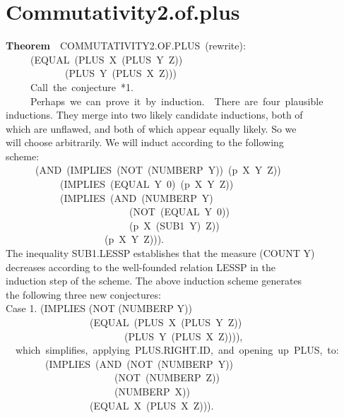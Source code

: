 \documentclass[10pt]{book}
\newenvironment{pubasis}{\begin{flushleft}}{\end{flushleft}}
\newcommand{\axiomordefinition}[1]{\vspace{6pt}\Large\textsf{\textbf{#1}}\normalsize}
\begin{document}
\section{Commutativity2.of.plus}
\begin{pubasis}
\axiomordefinition{Theorem}~~COMMUTATIVITY2.OF.PLUS~(rewrite):\\
~~~~~(EQUAL~(PLUS~X~(PLUS~Y~Z))\\
~~~~~~~~~~~~(PLUS~Y~(PLUS~X~Z)))\\

~~~~~Call~the~conjecture~*1.\\

~~~~~Perhaps~we~can~prove~it~by~induction.~~There~are~four~plausible\\
inductions.  They merge into two likely candidate inductions, both of\\
which are unflawed, and both of which appear equally likely.  So we\\
will choose arbitrarily.  We will induct according to the following\\
scheme:\\
~~~~~~(AND~(IMPLIES~(NOT~(NUMBERP~Y))~(p~X~Y~Z))\\
~~~~~~~~~~~(IMPLIES~(EQUAL~Y~0)~(p~X~Y~Z))\\
~~~~~~~~~~~(IMPLIES~(AND~(NUMBERP~Y)\\
~~~~~~~~~~~~~~~~~~~~~~~~~(NOT~(EQUAL~Y~0))\\
~~~~~~~~~~~~~~~~~~~~~~~~~(p~X~(SUB1~Y)~Z))\\
~~~~~~~~~~~~~~~~~~~~(p~X~Y~Z))).\\
The inequality SUB1.LESSP establishes that the measure (COUNT Y)\\
decreases according to the well-founded relation LESSP in the\\
induction step of the scheme.  The above induction scheme generates\\
the following three new conjectures:\\

Case 1.	(IMPLIES (NOT (NUMBERP Y))\\
~~~~~~~~~~~~~~~~~(EQUAL~(PLUS~X~(PLUS~Y~Z))\\
~~~~~~~~~~~~~~~~~~~~~~~~(PLUS~Y~(PLUS~X~Z)))),\\

~~which~simplifies,~applying~PLUS.RIGHT.ID,~and~opening~up~PLUS,~to:\\

~~~~~~~~(IMPLIES~(AND~(NOT~(NUMBERP~Y))\\
~~~~~~~~~~~~~~~~~~~~~~(NOT~(NUMBERP~Z))\\
~~~~~~~~~~~~~~~~~~~~~~(NUMBERP~X))\\
~~~~~~~~~~~~~~~~~(EQUAL~X~(PLUS~X~Z))).\\


\end{pubasis}
\end{document}
